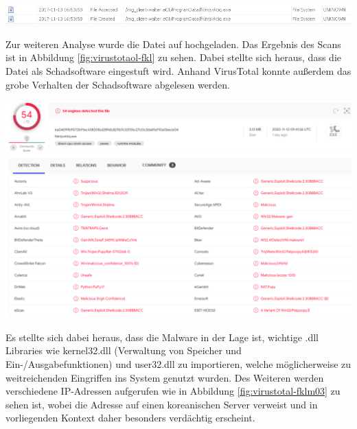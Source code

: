 \begin{center}
	\includegraphics[width=15.8cm]{figures/malware-fklm.png}
	\label{fig:malware-fklm}
\end{center}

Zur weiteren Analyse wurde die Datei auf  hochgeladen.
Das Ergebnis des Scans ist in Abbildung \ref{fig:virustotaol-fkl} zu sehen.
Dabei stellte sich heraus, dass die Datei als Schadsoftware eingestuft wird. Anhand VirusTotal konnte außerdem das grobe Verhalten der Schadsoftware abgelesen werden.
\begin{center}
	\includegraphics[width=15.8cm]{figures/virustotaol-fklm.PNG}
	\label{fig:virustotaol-fkl}
\end{center}

\newpage
Es stellte sich dabei heraus, dass die Malware in der Lage ist, wichtige .dll Libraries wie kernel32.dll (Verwaltung von Speicher und  Ein-/Ausgabefunktionen) und user32.dll zu importieren, welche möglicherweise zu weitreichenden Eingriffen ins System genutzt wurden.
Des Weiteren werden verschiedene IP-Adressen aufgerufen wie in Abbildung \ref{fig:virustotal-fklm03} zu sehen ist, wobei die Adresse  auf einen koreanischen Server verweist und in vorliegenden Kontext daher besonders verdächtig erscheint.

